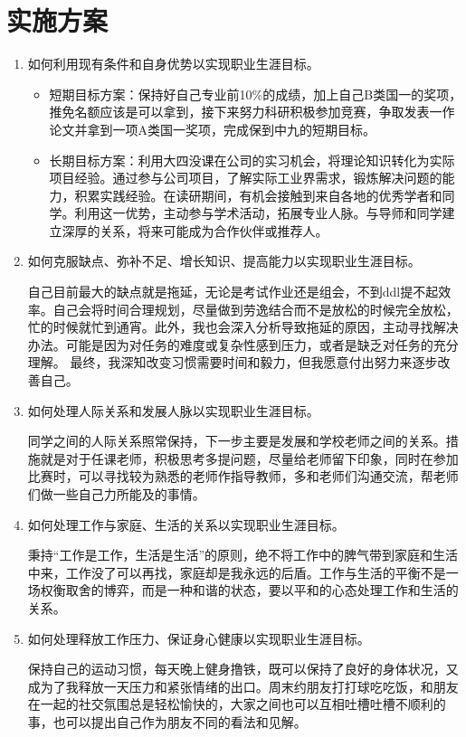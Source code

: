 \documentclass{article}
\begin{document}
\section{实施方案}
\begin{enumerate}[1、]
	\item 如何利用现有条件和自身优势以实现职业生涯目标。\par
	\begin{itemize}
		\item 短期目标方案：保持好自己专业前10\%的成绩，加上自己B类国一的奖项，推免名额应该是可以拿到，接下来努力科研积极参加竞赛，争取发表一作论文并拿到一项A类国一奖项，完成保到中九的短期目标。
		\item 长期目标方案：利用大四没课在公司的实习机会，将理论知识转化为实际项目经验。通过参与公司项目，了解实际工业界需求，锻炼解决问题的能力，积累实践经验。在读研期间，有机会接触到来自各地的优秀学者和同学。利用这一优势，主动参与学术活动，拓展专业人脉。与导师和同学建立深厚的关系，将来可能成为合作伙伴或推荐人。
	\end{itemize}
	\item 如何克服缺点、弥补不足、增长知识、提高能力以实现职业生涯目标。\par
	自己目前最大的缺点就是拖延，无论是考试作业还是组会，不到ddl提不起效率。自己会将时间合理规划，尽量做到劳逸结合而不是放松的时候完全放松，忙的时候就忙到通宵。此外，我也会深入分析导致拖延的原因，主动寻找解决办法。可能是因为对任务的难度或复杂性感到压力，或者是缺乏对任务的充分理解。
	最终，我深知改变习惯需要时间和毅力，但我愿意付出努力来逐步改善自己。
	\item 如何处理人际关系和发展人脉以实现职业生涯目标。\par
	同学之间的人际关系照常保持，下一步主要是发展和学校老师之间的关系。措施就是对于任课老师，积极思考多提问题，尽量给老师留下印象，同时在参加比赛时，可以寻找较为熟悉的老师作指导教师，多和老师们沟通交流，帮老师们做一些自己力所能及的事情。
	\item 如何处理工作与家庭、生活的关系以实现职业生涯目标。\par
	秉持“工作是工作，生活是生活”的原则，绝不将工作中的脾气带到家庭和生活中来，工作没了可以再找，家庭却是我永远的后盾。工作与生活的平衡不是一场权衡取舍的博弈，而是一种和谐的状态，要以平和的心态处理工作和生活的关系。
	\item 如何处理释放工作压力、保证身心健康以实现职业生涯目标。\par
	保持自己的运动习惯，每天晚上健身撸铁，既可以保持了良好的身体状况，又成为了我释放一天压力和紧张情绪的出口。周末约朋友打打球吃吃饭，和朋友在一起的社交氛围总是轻松愉快的，大家之间也可以互相吐槽吐槽不顺利的事，也可以提出自己作为朋友不同的看法和见解。
\end{enumerate}
\par 
\end{document}

